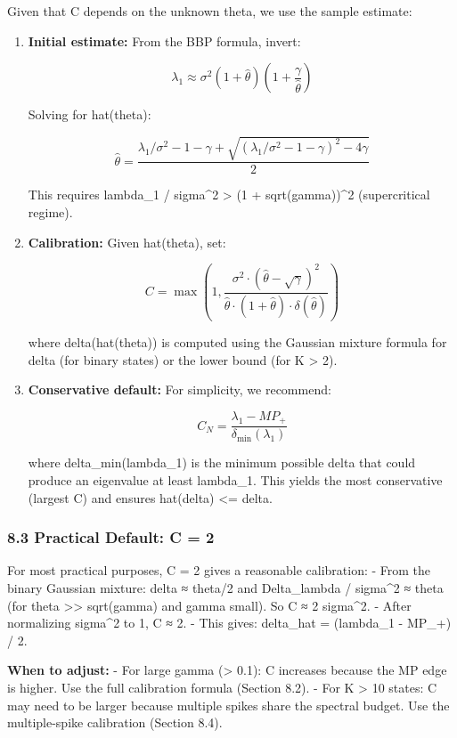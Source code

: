 \documentclass[
  12pt,
]{article}
\begin{document}
Given that C depends on the unknown theta, we use the sample estimate:

\begin{enumerate}
\def\labelenumi{\arabic{enumi}.}
\item
  \textbf{Initial estimate:} From the BBP formula, invert:

  \[\lambda_1 \approx \sigma^2 \left(1 + \hat{\theta}\right)\left(1 + \frac{\gamma}{\hat{\theta}}\right)\]

  Solving for hat(theta):

  \[\hat{\theta} = \frac{\lambda_1 / \sigma^2 - 1 - \gamma + \sqrt{(\lambda_1 / \sigma^2 - 1 - \gamma)^2 - 4\gamma}}{2}\]

  This requires lambda\_1 / sigma\^{}2 \textgreater{} (1 +
  sqrt(gamma))\^{}2 (supercritical regime).
\item
  \textbf{Calibration:} Given hat(theta), set:

  \[C = \max\left(1, \frac{\sigma^2 \cdot (\hat{\theta} - \sqrt{\gamma})^2}{\hat{\theta} \cdot (1 + \hat{\theta}) \cdot \delta(\hat{\theta})}\right)\]

  where delta(hat(theta)) is computed using the Gaussian mixture formula
  for delta (for binary states) or the lower bound (for K \textgreater{}
  2).
\item
  \textbf{Conservative default:} For simplicity, we recommend:

  \[C_N = \frac{\lambda_1 - MP_+}{\delta_{\text{min}}(\lambda_1)}\]

  where delta\_min(lambda\_1) is the minimum possible delta that could
  produce an eigenvalue at least lambda\_1. This yields the most
  conservative (largest C) and ensures hat(delta) \textless= delta.
\end{enumerate}

\subsubsection{8.3 Practical Default: C =
2}\label{practical-default-c-2}

For most practical purposes, C = 2 gives a reasonable calibration: -
From the binary Gaussian mixture: delta ≈ theta/2 and Delta\_lambda /
sigma\^{}2 ≈ theta (for theta \textgreater\textgreater{} sqrt(gamma) and
gamma small). So C ≈ 2 sigma\^{}2. - After normalizing sigma\^{}2 to 1,
C ≈ 2. - This gives: delta\_hat = (lambda\_1 - MP\_+) / 2.

\textbf{When to adjust:} - For large gamma (\textgreater{} 0.1): C
increases because the MP edge is higher. Use the full calibration
formula (Section 8.2). - For K \textgreater{} 10 states: C may need to
be larger because multiple spikes share the spectral budget. Use the
multiple-spike calibration (Section 8.4).
\end{document}
